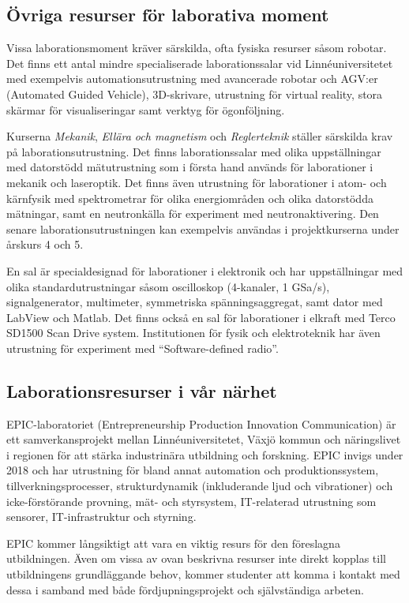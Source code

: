 \subsection{Övriga resurser för laborativa moment}

Vissa laborationsmoment kräver särskilda, ofta fysiska resurser såsom robotar. Det finns ett antal mindre specialiserade laborationssalar vid Linnéuniversitetet med exempelvis automationsutrustning med avancerade robotar och AGV:er (Automated Guided Vehicle), 3D-skrivare, utrustning för virtual reality, stora skärmar för visualiseringar samt verktyg för ögonföljning.

Kurserna \emph{Mekanik}, \emph{Ellära och magnetism} och \emph{Reglerteknik} ställer särskilda krav på laborationsutrustning. Det finns laborationssalar med olika uppställningar med datorstödd mätutrustning som i första hand används för laborationer i mekanik och laseroptik. Det finns även utrustning för laborationer i atom- och kärnfysik med spektrometrar för olika energiområden och olika datorstödda mätningar, samt en neutronkälla för experiment med neutronaktivering. Den senare laborationsutrustningen kan exempelvis användas i projektkurserna under årskurs 4 och 5.

En sal är specialdesignad för laborationer i elektronik och har uppställningar med olika standardutrustningar såsom oscilloskop (4-kanaler, 1 GSa/s), signalgenerator, multimeter, symmetriska spänningsaggregat, samt dator med LabView och Matlab. Det finns också en sal för laborationer i elkraft med Terco SD1500 Scan Drive system. Institutionen för fysik och elektroteknik har även utrustning för experiment med ``Software-defined radio''.

\subsection{Laborationsresurser i vår närhet}

EPIC-laboratoriet (Entrepreneurship Production Innovation Communication) är ett samverkansprojekt mellan Linnéuniversitetet, Växjö kommun och näringslivet i regionen för att stärka industrinära utbildning och forskning. EPIC invigs under 2018 och har utrustning för bland annat automation och produktionssystem, tillverkningsprocesser, strukturdynamik (inkluderande ljud och vibrationer) och icke-förstörande provning, mät- och styrsystem, IT-relaterad utrustning som sensorer, IT-infrastruktur och styrning.

EPIC kommer långsiktigt att vara en viktig resurs för den föreslagna utbildningen. Även om vissa av ovan beskrivna resurser inte direkt kopplas till utbildningens grundläggande behov, kommer studenter att komma i kontakt med dessa i samband med både fördjupningsprojekt och självständiga arbeten.


